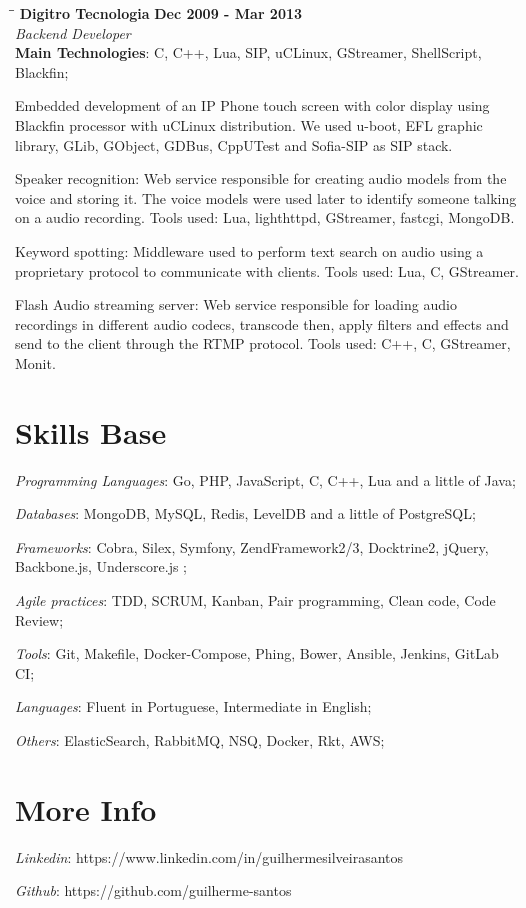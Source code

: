 \documentclass[margin]{res}
\begin{document}
\begin{resume}
\vspace{-0.1in}
    \begin{tabbing}
    \hspace{2.3in}\= \hspace{1.7in}\= \kill
    \textbf{Digitro Tecnologia}    \>\>\textbf{Dec 2009 - Mar 2013}\\
    \textit{Backend Developer}\\
    \textbf{Main Technologies}: C, C++, Lua, SIP, uCLinux, GStreamer, ShellScript, Blackfin;
    \end{tabbing}\vspace{-20pt}
    \vspace{2mm}
Embedded development of an IP Phone touch screen with color display using Blackfin processor with uCLinux distribution. We used u-boot, EFL graphic library, GLib, GObject, GDBus, CppUTest and Sofia-SIP as SIP stack.
    
Speaker recognition: Web service responsible for creating audio models from the voice and storing it. The voice models were used later to identify someone talking on a audio recording. Tools used: Lua, lighthttpd, GStreamer, fastcgi, MongoDB.

Keyword spotting: Middleware used to perform text search on audio using a proprietary protocol to communicate with clients. Tools used: Lua, C, GStreamer.

Flash Audio streaming server: Web service responsible for loading audio recordings in different audio codecs, transcode then, apply filters and effects and send to the client through the RTMP protocol. Tools used: C++, C, GStreamer, Monit.

\section{Skills Base} \textit{Programming Languages}: Go, PHP, JavaScript, C, C++, Lua and a little of Java;

	\textit{Databases}: MongoDB, MySQL, Redis, LevelDB and a little of PostgreSQL;
	
	\textit{Frameworks}: Cobra, Silex, Symfony, ZendFramework2/3, Docktrine2, jQuery, Backbone.js, Underscore.js ;

	\textit{Agile practices}: TDD, SCRUM, Kanban, Pair programming, Clean code, Code Review;
	
	\textit{Tools}: Git, Makefile, Docker-Compose, Phing, Bower, Ansible, Jenkins, GitLab CI;
	
	\textit{Languages}: Fluent in Portuguese, Intermediate in English;
	
	\textit{Others}: ElasticSearch, RabbitMQ, NSQ, Docker, Rkt, AWS;

\section{More Info} \textit{Linkedin}: https://www.linkedin.com/in/guilhermesilveirasantos

    \textit{Github}: https://github.com/guilherme-santos

\end{resume}
\end{document}
